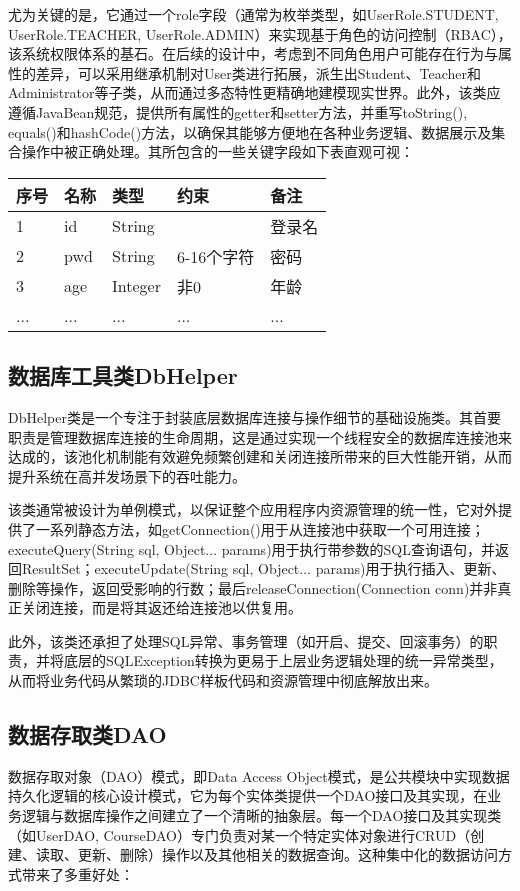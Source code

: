 \documentclass[a4paper]{ctexart}
\begin{document}
尤为关键的是，它通过一个role字段（通常为枚举类型，如UserRole.STUDENT, UserRole.TEACHER, UserRole.ADMIN）来实现基于角色的访问控制（RBAC），该系统权限体系的基石。在后续的设计中，考虑到不同角色用户可能存在行为与属性的差异，可以采用继承机制对User类进行拓展，派生出Student、Teacher和Administrator等子类，从而通过多态特性更精确地建模现实世界。此外，该类应遵循JavaBean规范，提供所有属性的getter和setter方法，并重写toString(), equals()和hashCode()方法，以确保其能够方便地在各种业务逻辑、数据展示及集合操作中被正确处理。其所包含的一些关键字段如下表直观可视：
\begin{tabular}{lllll}
    \toprule
    \textbf{序号} & \textbf{名称} & \textbf{类型}    & \textbf{约束}            & \textbf{备注} \\
    \midrule
    1           & id           & String          &               &登录名\\
    2           & pwd          & String         & 6-16个字符    &密码  \\
    3           & age          & Integer        & 非0           &年龄 \\
    ...         & ...           & ...            &...            &...\\
    \bottomrule
\end{tabular}
\subsection{数据库工具类DbHelper}
DbHelper类是一个专注于封装底层数据库连接与操作细节的基础设施类。其首要职责是管理数据库连接的生命周期，这是通过实现一个线程安全的数据库连接池来达成的，该池化机制能有效避免频繁创建和关闭连接所带来的巨大性能开销，从而提升系统在高并发场景下的吞吐能力。

该类通常被设计为单例模式，以保证整个应用程序内资源管理的统一性，它对外提供了一系列静态方法，如getConnection()用于从连接池中获取一个可用连接；executeQuery(String sql, Object... params)用于执行带参数的SQL查询语句，并返回ResultSet；executeUpdate(String sql, Object... params)用于执行插入、更新、删除等操作，返回受影响的行数；最后releaseConnection(Connection conn)并非真正关闭连接，而是将其返还给连接池以供复用。

此外，该类还承担了处理SQL异常、事务管理（如开启、提交、回滚事务）的职责，并将底层的SQLException转换为更易于上层业务逻辑处理的统一异常类型，从而将业务代码从繁琐的JDBC样板代码和资源管理中彻底解放出来。
\subsection{数据存取类DAO}
数据存取对象（DAO）模式，即Data Access Object模式，是公共模块中实现数据持久化逻辑的核心设计模式，它为每个实体类提供一个DAO接口及其实现，在业务逻辑与数据库操作之间建立了一个清晰的抽象层。每一个DAO接口及其实现类（如UserDAO, CourseDAO）专门负责对某一个特定实体对象进行CRUD（创建、读取、更新、删除）操作以及其他相关的数据查询。这种集中化的数据访问方式带来了多重好处：
\end{document}
